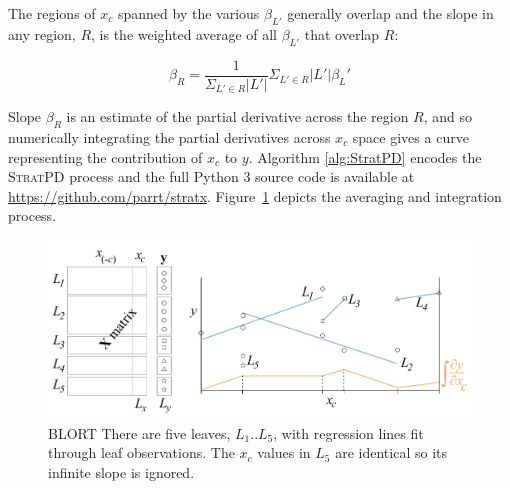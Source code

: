 \documentclass[12pt]{article}
\newcommand{\figref}[1]{Figure~\ref{#1}}
\newcommand{\cut}[1]{}
\newcommand{\spd}{\fontfamily{cmr}\textsc{\small StratPD}}
\newcommand{\xnc}{$x_{\overline{c}}$}
\begin{document}
The regions of $x_c$ spanned by the various $\beta_{L'}$ generally overlap and the slope in any  region, $R$, is the weighted average of all $\beta_{L'}$ that overlap $R$:

\[
\beta_R = \frac{1}{\Sigma_{L' \in R} |L'|}\Sigma_{L' \in R}|L'|\beta_L'
\]

Slope $\beta_R$ is an estimate of the partial derivative across the region $R$, and so numerically integrating the partial derivatives across $x_c$ space gives a curve representing the contribution of $x_c$ to $y$.  Algorithm \ref{alg:StratPD} encodes the \spd{} process and the full Python 3 source code is available at {\small \url{https://github.com/parrt/stratx}}. \figref{fig:leaves} depicts the averaging and integration process.  

\begin{figure}[htbp]
\begin{center}
\includegraphics[scale=0.7]{images/leaves.pdf}
\caption{BLORT There are five leaves, $L_1 .. L_5$, with regression lines fit through leaf observations. The $x_c$ values in $L_5$ are identical so its infinite slope is ignored.}
\label{fig:leaves}
\end{center}
\end{figure}

\cut{
\spd{} trains a decision tree in the usual way but on $(x_{\overline{c}}, {\bf y})$ rather than $({\bf X}, {\bf y})$. Observations $(X_i, y_i)$ that end up in a tree leaf are, by definition, in the same region of \xnc{} feature space. Training greedily partitions feature space in order to minimize variance of $y_i$ within regions, which partitions feature space into tighter and tighter regions.  (The collection of variable inequality decision nodes along the path from from root to a leaf demarcates the region of feature space.) Tighter regions imply more similar \xnc{} values, which means $x_c$ is likely responsible for any variation in $y$; this likelihood decreases as the size of $L$ increases.  The training process must leave at least two samples per leaf in order to fit a localized linear model.  
}
\end{document}
